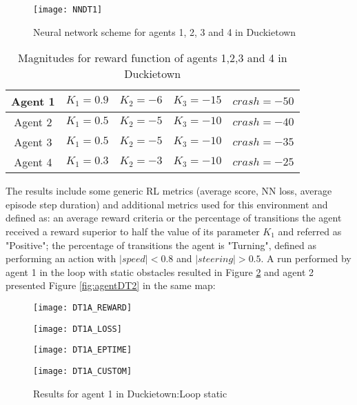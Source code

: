 \documentclass[journal]{IEEEtran}
\begin{document}
	\begin{figure}[hbt!]
		\hfill\texttt{[image: NNDT1]}\hspace*{\fill}
		\caption{Neural network scheme for agents 1, 2, 3 and 4 in Duckietown}
		\label{fig:NNDT1}
	\end{figure}
		
	\begin{table}[hbt!]
		\centering
			
		\begin{tabular}{ c || c | c | c | c }
				
			Agent 1 & $K_1 = 0.9$ & $K_2 = -6$ & $K_3 = -15$ & $crash = -50$\\
					
			\hline
			Agent 2 & $K_1 = 0.5$ & $K_2 = -5$ & $K_3 = -10$ & $crash = -40$\\
					
			\hline
			Agent 3 & $K_1 = 0.5$ & $K_2 = -5$ & $K_3 = -10$ & $crash = -35$\\
					
			\hline
			Agent 4 & $K_1 = 0.3$ & $K_2 = -3$ & $K_3 = -10$ & $crash = -25$\\
					
		\end{tabular}
				
		\caption{Magnitudes for reward function of agents 1,2,3 and 4 in Duckietown}
		\label{table:RWDT1}
	\end{table}
	
	The results include some generic RL metrics (average score, NN loss, average episode step duration) and additional metrics used for this environment and defined as: an average reward criteria or the percentage of transitions the agent received a reward superior to half the value of its parameter $K_1$ and referred as "Positive"; the percentage of transitions the agent is "Turning", defined as performing an action with $|speed| < 0.8$ and $|steering| > 0.5$. A run performed by agent 1 in the loop with static obstacles resulted in Figure \ref{fig:agentDT1} and agent 2 presented Figure \ref{fig:agentDT2} in the same map:
			
		\begin{figure}[hbt!]
			\centering
			
			\begin{minipage}[b]{4cm}
  				\texttt{[image: DT1A\_REWARD]}
 			\end{minipage}
			\quad
			\begin{minipage}[b]{4cm}
  				\texttt{[image: DT1A\_LOSS]}
			\end{minipage}
			\quad
			\begin{minipage}[b]{4cm}
  				\texttt{[image: DT1A\_EPTIME]}
 			\end{minipage}
			\quad
			\begin{minipage}[b]{4cm}
  				\texttt{[image: DT1A\_CUSTOM]}
			\end{minipage}
			
			\caption{Results for agent 1 in Duckietown:Loop static}
  			\label{fig:agentDT1}
		\end{figure}
		
\end{document}
